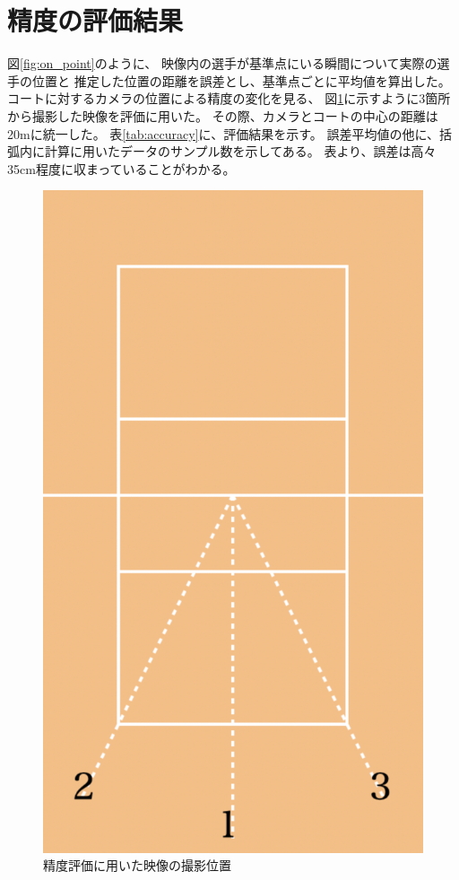 \documentclass[a4j, fleqn, 12pt]{jsreport}
\begin{document}
    \section{精度の評価結果}
        図\ref{fig:on_point}のように、
        映像内の選手が基準点にいる瞬間について実際の選手の位置と
        推定した位置の距離を誤差とし、基準点ごとに平均値を算出した。
        コートに対するカメラの位置による精度の変化を見る、
        図\ref{fig:camera}に示すように3箇所から撮影した映像を評価に用いた。
        その際、カメラとコートの中心の距離は20mに統一した。
        表\ref{tab:accuracy}に、評価結果を示す。
        誤差平均値の他に、括弧内に計算に用いたデータのサンプル数を示してある。
        表より、誤差は高々35cm程度に収まっていることがわかる。

        \begin{figure}[ht]
            \centering
            \includegraphics[width=0.5\hsize]{images/camera.png}
            \caption{精度評価に用いた映像の撮影位置}
            \label{fig:camera}
        \end{figure}
\end{document}
